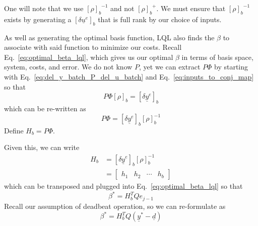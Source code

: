 One will note that we use ${{\left[\rho\right]}_b}^{-1}$ and not ${{\left[\rho\right]}_b}^+$. We must ensure that ${{\left[\rho\right]}_b}^{-1}$ exists by generating a ${\left[\delta\underline{u}^e\right]}_b$ that is full rank by our choice of inputs.

As well as generating the optimal basis function, LQL also finds the $\beta$ to associate with said function to minimize our costs. Recall Eq.~\ref{eq:optimal_beta_lql}, which gives us our optimal $\beta$ in terms of basis space, system, costs, and error. We do not know $P$, yet we can extract $P\Phi$ by starting with Eq.~\ref{eq:del_y_batch_P_del_u_batch} and Eq.~\ref{eq:inputs_to_conj_map} so that
\begin{equation}
    P \Phi {\left[\rho\right]}_b = {\left[\delta\underline{y}^e\right]}_b
\end{equation}
which can be re-written as
\begin{equation}
    P \Phi = {\left[\delta\underline{y}^e\right]}_b {\left[\rho\right]}_b^{-1}
\end{equation}
Define $H_b = P \Phi$. 

Given this, we can write
\begin{equation}
    \begin{split}
        H_b &= {\left[\delta\underline{y}^e\right]}_b {\left[\rho\right]}_b^{-1} \\
        &= \begin{bmatrix}
            h_1 & h_2 & \cdots & h_b
        \end{bmatrix}
    \end{split}
    \label{eq:batch_Hb}
\end{equation}
which can be transposed and plugged into Eq.~\ref{eq:optimal_beta_lql} so that
\begin{equation}
    \beta^\ast = H_b^T Q e_{j-1}
    \label{eq:beta_batch}
\end{equation}
Recall our assumption of deadbeat operation, so we can re-formulate as
\begin{equation}
    \beta^\ast = H_b^T Q (\underline{y}^\ast - \underline{d})
\end{equation}

